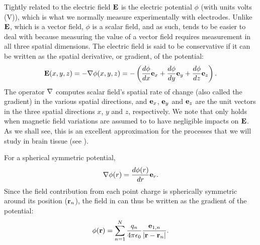 Tightly related to the electric field ${\bf E}$ is the electric potential $\phi$ (with units volts (\si{\volt})), which is what we normally measure experimentally with electrodes. Unlike ${\bf E}$, which is a vector field, $\phi$ is a scalar field, and as such, tends to be easier to deal with because measuring the value of a vector field requires measurement in all three spatial dimensions. The electric field is said to be conservative if it can be written as the spatial derivative, or gradient, of the potential:
\begin{equation}
{\bf E}(x,y,z) = - {\bf \nabla} \phi(x,y,z) = - \left(\frac{d\phi}{dx} {\bf e}_x  + \frac{d\phi}{dy} {\bf e}_y + \frac{d\phi}{dz} {\bf e}_z \right).
\label{eq:Basics:EV}
\end{equation}
The operator ${\bf \nabla}$ computes scalar field's spatial rate of change (also called the gradient) in the various spatial directions, and ${\bf e}_x$, ${\bf e}_y$ and  ${\bf e}_z$ are the unit vectors in the three spatial directions $x$, $y$ and $z$, respectively. We note that  only holds when magnetic field variations are assumed to to have negligible impacts on ${\bf E}$. As we shall see, this is an excellent approximation for the processes that we will study in brain tissue (see 
).

For a spherical symmetric potential,
\begin{equation}
{\bf \nabla} \phi(r) = \frac{d\phi(r)}{dr} {\bf {e}}_r.
\label{eq:Basics:SphericalNablaPhi}
\end{equation}
Since the field contribution from each point charge is spherically symmetric around its position (${\bf r}_n$), the field in  can thus be written as the gradient of the potential:
\begin{equation}
{\phi}({\bf r}) = \sum_{n=1}^{N}  \frac{q_n}{4\pi \epsilon_0} \frac{{{\bf e}}_{1,n}}{|{\bf r}-{\bf r}_n|}.
\label{eq:Basics:CoulombPhiN}
\end{equation}

